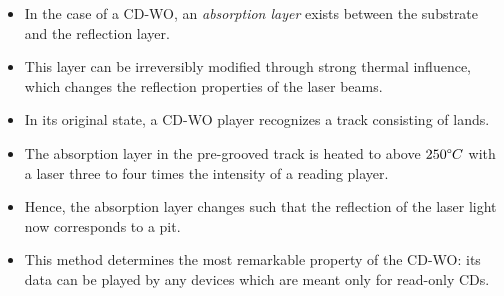 \begin{itemize}
	\item In the case of a CD-WO, an \textit{absorption layer} exists between the substrate and the reflection layer. 
	\item This layer can be irreversibly modified through strong thermal influence, which changes the reflection properties	of the laser beams.

		\item In its original state, a CD-WO player recognizes a track consisting of lands. 
		\item The absorption layer in the pre-grooved track is heated to above $ 250 \degree C $ with a laser three to four times the intensity of a reading player. 
		\item Hence, the absorption layer changes such that the reflection of the laser light now corresponds to a pit. 
		\item This method determines the most remarkable property of the CD-WO: its data can be played by any devices which are meant only for read-only CDs.
\end{itemize}

